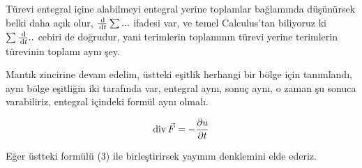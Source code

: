 \documentclass[12pt,fleqn]{article}\usepackage{../../common}
\begin{document}
Türevi entegral içine alabilmeyi entegral yerine toplamlar bağlamında düşünürsek
belki daha açık olur, $\frac{\,\mathrm{d}}{\,\mathrm{d} t} \sum ...$ ifadesi var, ve temel
Calculus'tan biliyoruz ki $\sum \frac{\,\mathrm{d}}{\,\mathrm{d} t} .. $ cebiri de doğrudur,
yani terimlerin toplamının türevi yerine terimlerin türevinin toplamı aynı şey.

Mantık zincirine devam edelim, üstteki eşitlik herhangi bir bölge için
tanımlandı, aynı bölge eşitliğin iki tarafında var, entegral aynı, sonuç
aynı, o zaman şu sonuca varabiliriz, entegral içindeki formül aynı olmalı.

$$
\operatorname{div} \vec{F}  = - \frac{\partial u}{\partial t}
$$

Eğer üstteki formülü (3) ile birleştirirsek yayınım denklemini elde ederiz.
\end{document}
